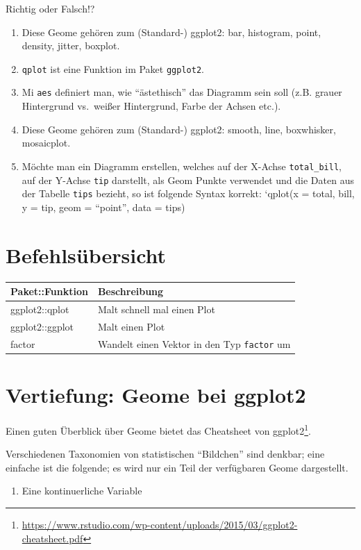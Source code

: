 \documentclass[12pt,ngerman,]{book}
\providecommand{\tightlist}{%
  \setlength{\itemsep}{0pt}\setlength{\parskip}{0pt}}
\let\rmarkdownfootnote\footnote%
\def\footnote{\protect\rmarkdownfootnote}
\let\BeginKnitrBlock\begin \let\EndKnitrBlock\end
\begin{document}
\BeginKnitrBlock{rmdexercises}
Richtig oder Falsch!?

\begin{enumerate}
\def\labelenumi{\arabic{enumi}.}
\item
  Diese Geome gehören zum (Standard-) ggplot2: bar, histogram, point,
  density, jitter, boxplot.
\item
  \texttt{qplot} ist eine Funktion im Paket \texttt{ggplot2}.
\item
  Mi \texttt{aes} definiert man, wie ``ästethisch'' das Diagramm sein
  soll (z.B. grauer Hintergrund vs.~weißer Hintergrund, Farbe der Achsen
  etc.).
\item
  Diese Geome gehören zum (Standard-) ggplot2: smooth, line, boxwhisker,
  mosaicplot.
\item
  Möchte man ein Diagramm erstellen, welches auf der X-Achse
  \texttt{total\_bill}, auf der Y-Achse \texttt{tip} darstellt, als Geom
  Punkte verwendet und die Daten aus der Tabelle \texttt{tips} bezieht,
  so ist folgende Syntax korrekt: `qplot(x = total, bill, y = tip, geom
  = ``point'', data = tips)
\end{enumerate}
\EndKnitrBlock{rmdexercises}

\section{Befehlsübersicht}\label{befehlsubersicht-5}

\begin{longtable}[]{@{}ll@{}}
\toprule
Paket::Funktion & Beschreibung\tabularnewline
\midrule
\endhead
ggplot2::qplot & Malt schnell mal einen Plot\tabularnewline
ggplot2::ggplot & Malt einen Plot\tabularnewline
factor & Wandelt einen Vektor in den Typ \texttt{factor}
um\tabularnewline
\bottomrule
\end{longtable}

\section{Vertiefung: Geome bei ggplot2}\label{geome}

Einen guten Überblick über Geome bietet das Cheatsheet von
ggplot2\footnote{\url{https://www.rstudio.com/wp-content/uploads/2015/03/ggplot2-cheatsheet.pdf}}.

Verschiedenen Taxonomien von statistischen ``Bildchen'' sind denkbar;
eine einfache ist die folgende; es wird nur ein Teil der verfügbaren
Geome dargestellt.

\begin{enumerate}
\def\labelenumi{\arabic{enumi}.}
\tightlist
\item
  Eine kontinuerliche Variable
\end{enumerate}
\end{document}
